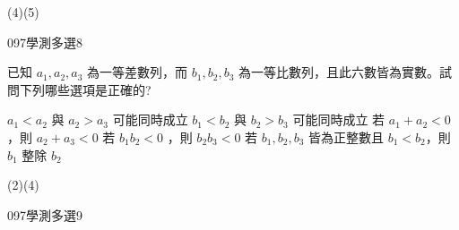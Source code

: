 \begin{QUESTIONS}
\begin{QUESTION}
        \begin{QFROMS}
        \end{QFROMS}
        \begin{QTAGS}\end{QTAGS}
        \begin{QANS}
            (4)(5)
        \end{QANS}
        \begin{QSOLLIST}
        \end{QSOLLIST}
        \begin{QEMPTYSPACE}
        \end{QEMPTYSPACE}
    \end{QUESTION}
    \begin{QUESTION}
        \begin{ExamInfo}{097}{學測}{多選}{8}
        \end{ExamInfo}
        \begin{ExamAnsRateInfo}{36}{57}{36}{15}
        \end{ExamAnsRateInfo}
        \begin{QBODY}
			已知 $a_1 , a_2 , a_3$ 為一等差數列，而 $b_1 , b_2 , b_3$ 為一等比數列，且此六數皆為實數。試問下列哪些選項是正確的?
			\begin{QOPS} 
				\QOP  $a_1 <a_2$ 與 $a_2 >a_3$ 可能同時成立 
				\QOP $b_1 <b_2$ 與 $b_2 >b_3$ 可能同時成立 \quad 
				\QOP 若 $a_1 +a_2 <0$，則 $a_2 +a_3 <0$ 
				\QOP 若 $b_1b_2 <0$ ，則 $b_2b_3 <0$ 
				\QOP 若 $b_1,b_2,b_3$ 皆為正整數且 $b_1 <b_2$，則 $b_1$ 整除 $b_2$
			\end{QOPS}
        \end{QBODY}
        \begin{QFROMS}
        \end{QFROMS}
        \begin{QTAGS}\end{QTAGS}
        \begin{QANS}
            (2)(4)
        \end{QANS}
        \begin{QSOLLIST}
        \end{QSOLLIST}
        \begin{QEMPTYSPACE}
        \end{QEMPTYSPACE}
    \end{QUESTION}
    \begin{QUESTION}
        \begin{ExamInfo}{097}{學測}{多選}{9}
        \end{ExamInfo}

\end{QUESTION}
\end{QUESTIONS}
